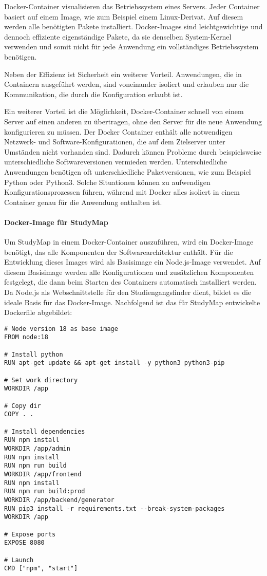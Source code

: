 Docker-Container visualisieren das Betriebssystem eines Servers. Jeder Container basiert auf einem Image, wie zum Beispiel einem Linux-Derivat. Auf diesem werden alle benötigten Pakete installiert. Docker-Images sind leichtgewichtige und dennoch effiziente eigenständige Pakete, da sie denselben System-Kernel verwenden und somit nicht für jede Anwendung ein vollständiges Betriebssystem benötigen. \parencite{docker_inc_what_2024}

Neben der Effizienz ist Sicherheit ein weiterer Vorteil. Anwendungen, die in Containern ausgeführt werden, sind voneinander isoliert und erlauben nur die Kommunikation, die durch die Konfiguration erlaubt ist. \parencite{docker_inc_what_2024}

Ein weiterer Vorteil ist die Möglichkeit, Docker-Container schnell von einem Server auf einen anderen zu übertragen, ohne den Server für die neue Anwendung konfigurieren zu müssen. Der Docker Container enthält alle notwendigen Netzwerk- und Software-Konfigurationen, die auf dem Zielserver unter Umständen nicht vorhanden sind. Dadurch können Probleme durch beispielsweise unterschiedliche Softwareversionen vermieden werden. Unterschiedliche Anwendungen benötigen oft unterschiedliche Paketversionen, wie zum Beispiel Python oder Python3. Solche Situationen können zu aufwendigen Konfigurationsprozessen führen, während mit Docker alles isoliert in einem Container genau für die Anwendung enthalten ist. \parencite{amazon_web_services_inc_was_2023}

\paragraph*{Docker-Image für StudyMap}
Um StudyMap in einem Docker-Container auszuführen, wird ein Docker-Image benötigt, das alle Komponenten der Softwarearchitektur enthält. Für die Entwicklung dieses Images wird als Basisimage ein Node.js-Image verwendet. Auf diesem Basisimage werden alle Konfigurationen und zusätzlichen Komponenten festgelegt, die dann beim Starten des Containers automatisch installiert werden. Da Node.js als Webschnittstelle für den Studiengangsfinder dient, bildet es die ideale Basis für das Docker-Image. Nachfolgend ist das für StudyMap entwickelte Dockerfile abgebildet:

\begin{lstlisting}[style=Python]
# Node version 18 as base image
FROM node:18

# Install python
RUN apt-get update && apt-get install -y python3 python3-pip

# Set work directory
WORKDIR /app

# Copy dir
COPY . .

# Install dependencies
RUN npm install
WORKDIR /app/admin
RUN npm install
RUN npm run build
WORKDIR /app/frontend
RUN npm install
RUN npm run build:prod
WORKDIR /app/backend/generator
RUN pip3 install -r requirements.txt --break-system-packages
WORKDIR /app

# Expose ports
EXPOSE 8080

# Launch
CMD ["npm", "start"]
\end{lstlisting}


